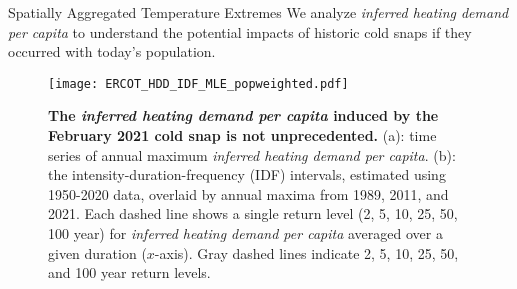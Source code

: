 \begin{block}{Spatially Aggregated Temperature Extremes}
    We analyze \emph{inferred heating demand per capita} to understand the potential impacts of historic cold snaps if they occurred with today's population.
    \begin{framed}
        \begin{figure}
            \centering
            \texttt{[image: ERCOT\_HDD\_IDF\_MLE\_popweighted.pdf]}\\
            \caption{
                \textbf{The \emph{inferred heating demand per capita} induced by the February 2021 cold snap is not unprecedented.}
                (a): time series of annual maximum \emph{inferred heating demand per capita}.
                (b): the intensity-duration-frequency (IDF) intervals, estimated using 1950-2020 data, overlaid by annual maxima from 1989, 2011, and 2021.
                Each dashed line shows a single return level (2, 5, 10, 25, 50, 100 year) for \emph{inferred heating demand per capita} averaged over a given duration ($x$-axis).
                Gray dashed lines indicate 2, 5, 10, 25, 50, and 100 year return levels.
            }\label{fig:idf_weighted}
        \end{figure}
    \end{framed}
\end{block}